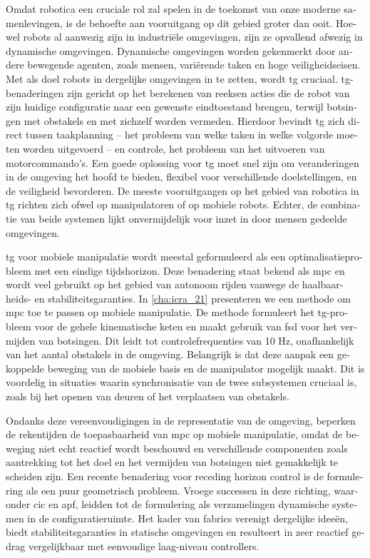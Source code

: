\acresetall
\begin{otherlanguage}{dutch}
Omdat robotica een cruciale rol zal spelen in de toekomst van onze moderne
samenlevingen, is de behoefte aan vooruitgang op dit gebied groter dan ooit.
Hoewel robots al aanwezig zijn in industriële omgevingen, zijn ze opvallend
afwezig in dynamische omgevingen. Dynamische omgevingen worden gekenmerkt door
andere bewegende agenten, zoals mensen, variërende taken en hoge
veiligheidseisen. Met als doel robots in dergelijke omgevingen in te zetten,
wordt \ac{tg} cruciaal. \Ac{tg}-benaderingen zijn gericht op het berekenen van
reeksen acties die de robot van zijn huidige configuratie naar een
gewenste eindtoestand brengen, terwijl botsingen met obstakels en met zichzelf
worden vermeden. Hierdoor bevindt \ac{tg} zich direct tussen taakplanning – het
probleem van welke taken in welke volgorde moeten worden uitgevoerd – en
controle, het probleem van het uitvoeren van motorcommando's. Een goede
oplossing voor \ac{tg} moet snel zijn om veranderingen in de omgeving het hoofd
te bieden, flexibel voor verschillende doelstellingen, en de veiligheid
bevorderen. De meeste vooruitgangen op het gebied van robotica in \ac{tg}
richten zich ofwel op manipulatoren of op mobiele robots. Echter, de combinatie
van beide systemen lijkt onvermijdelijk voor inzet in door mensen gedeelde
omgevingen.

\Ac{tg} voor mobiele manipulatie wordt meestal geformuleerd als een
optimalisatieprobleem met een eindige tijdshorizon. Deze benadering staat bekend
als \ac{mpc} en wordt veel gebruikt op het gebied van autonoom rijden vanwege de
haalbaarheids- en stabiliteitsgaranties. In \cref{cha:icra_21} presenteren we
een methode om \ac{mpc} toe te passen op mobiele manipulatie. De methode
formuleert het \ac{tg}-probleem voor de gehele kinematische keten en maakt
gebruik van \ac{fsd} voor het vermijden van botsingen. Dit leidt tot
controlefrequenties van 10 Hz, onafhankelijk van het aantal obstakels in de
omgeving. Belangrijk is dat deze aanpak een gekoppelde beweging van de mobiele
basis en de manipulator mogelijk maakt. Dit is voordelig in situaties waarin
synchronisatie van de twee subsystemen cruciaal is, zoals bij het openen van
deuren of het verplaatsen van obstakels.

Ondanks deze vereenvoudigingen in de representatie van de omgeving, beperken de
rekentijden de toepasbaarheid van \ac{mpc} op mobiele manipulatie, omdat de
beweging niet echt reactief wordt beschouwd en verschillende componenten zoals
aantrekking tot het doel en het vermijden van botsingen
niet gemakkelijk te scheiden zijn. Een
recente benadering voor receding horizon control is de formulering als een
puur geometrisch probleem. Vroege successen in deze richting, waaronder \ac{cic}
en \ac{apf}, leidden tot de formulering als verzamelingen dynamische systemen
in de configuratieruimte. Het kader van \ac{fabrics}
verenigt dergelijke ideeën, biedt stabiliteitsgaranties in statische omgevingen
en resulteert in zeer reactief gedrag vergelijkbaar met eenvoudige laag-niveau
controllers.


\end{otherlanguage}
